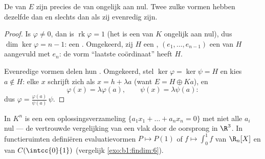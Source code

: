 \begin{theorem}\label{thm:b1:linmaps:hyperplanes}
De  van $E$ zijn precies de  van 
ongelijk aan nul. Twee zulke vormen hebben dezelfde  dan en
slechts dan als zij evenredig zijn.
\end{theorem}

\begin{proof}
Is $\varphi \neq 0$, dan is $\operatorname{rk}\varphi = 1$ (het
 is een  van $K$ ongelijk aan nul), dus
$\dim\ker\varphi = n - 1$: een . Omgekeerd, zij $H$ een
, $(e_1, \dots, e_{n-1})$ een  van $H$ aangevuld met
$e_n$: de vorm ``laatste coördinaat'' heeft  $H$.

Evenredige vormen delen hun . Omgekeerd, stel $\ker\varphi =
\ker\psi = H$ en kies $a \notin H$: elke $x$ schrijft zich als $x =
h + \lambda a$ (want $E = H \oplus Ka$), en
\[
\varphi(x) = \lambda \varphi(a), \qquad \psi(x) = \lambda\psi(a):
\]
dus $\varphi = \frac{\varphi(a)}{\psi(a)}\,\psi$.
\end{proof}

\begin{example}\label{ex:b1:linmaps:hyperplane}
In $K^n$ is een  een oplossingsverzameling $\{a_1 x_1 +
\dots + a_n x_n = 0\}$ met niet alle $a_i$ nul --- de vertrouwde
vergelijking van een vlak door de oorsprong in $\R^3$. In
functieruimten definiëren evaluatievormen $P \mapsto P(1)$ of $f
\mapsto \int_0^1 f$  van $\R_n[X]$ en van
$C(\intcc{0}{1})$ (vergelijk \cref{exo:b1:findim:6}).
\end{example}


